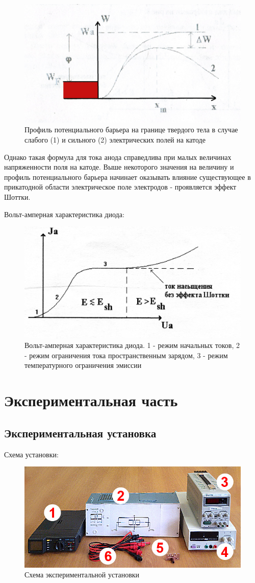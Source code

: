 \begin{figure}[h!]
	\centering
	\includegraphics[width=0.75\linewidth]{fig/img8085.jpg}
	\caption{Профиль потенциального барьера на границе твердого тела в случае слабого (1) и сильного (2) электрических полей на катоде}
	\label{fig:8}
\end{figure}

Однако такая формула для тока анода справедлива при малых величинах напряженности поля на катоде. Выше некоторого значения на величину и профиль потенциального барьера начинает оказывать влияние существующее в прикатодной области электрическое поле электродов - проявляется эффект Шоттки. 

Вольт-амперная характеристика диода:
 \begin{figure}[h!]
	\centering
	\includegraphics[width=0.75\linewidth]{fig/img8092.jpg}
	\caption{Вольт-амперная характеристика диода. 1 - режим начальных токов, 2 - режим ограничения тока пространственным зарядом, 3 - режим температурного ограничения эмиссии}
	\label{fig:9}
\end{figure}


\section{Экспериментальная часть}
\subsection{Экспериментальная установка}
Схема установки:
\begin{figure}[h!]
	\centering
	\includegraphics[width=0.5\linewidth]{fig/img9.jpg}
	\caption{Схема экспериментальной установки}
	\label{fig:10}
\end{figure}

